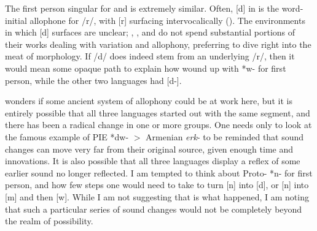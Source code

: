 \documentclass[output=paper]{LSP/langsci}
\begin{document}
The first person singular for  and  is extremely similar. Often, [d] in  is the word-initial allophone for /r/, with [r] surfacing intervocalically (\citealt{Rudes2007}). The environments in which  [d] surfaces are unclear; \citet{Gatschet1885}, \citet{Wagner1934}, and \citet{Linn2000} do not spend substantial portions of their works dealing with variation and allophony, preferring to dive right into the meat of morphology. If  /d/ does indeed stem from an underlying /r/, then it would mean some opaque path to explain how  wound up with *w- for first person, while the other two languages had [d-]. 

\citet{Rankin1998scy} wonders if some ancient system of allophony could be at work here, but it is entirely possible that all three languages started out with the same segment, and there has been a radical change in one or more groups. One needs only to look at the famous example of PIE *dw- $>$ Armenian \emph{erk}- to be reminded that sound changes can move very far from their original source, given enough time and innovations. It is also possible that all three languages display a reflex of some earlier sound no longer reflected. I am tempted to think about Proto- *n- for first person, and how few steps one would need to take to turn [n] into [d], or [n] into [m] and then [w]. While I am not suggesting that is what happened, I am noting that such a particular series of sound changes would not be completely beyond the realm of possibility.
\end{document}
